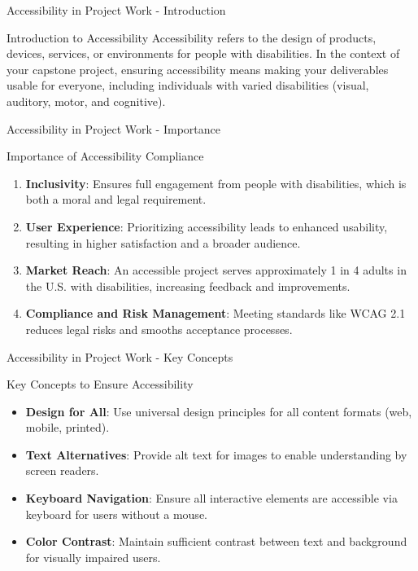 \documentclass[aspectratio=169]{beamer}
\begin{document}
\begin{frame}[fragile]{Accessibility in Project Work - Introduction}
    \begin{block}{Introduction to Accessibility}
        Accessibility refers to the design of products, devices, services, or environments for people with disabilities. In the context of your capstone project, ensuring accessibility means making your deliverables usable for everyone, including individuals with varied disabilities (visual, auditory, motor, and cognitive).
    \end{block}
\end{frame}

\begin{frame}[fragile]{Accessibility in Project Work - Importance}
    \begin{block}{Importance of Accessibility Compliance}
        \begin{enumerate}
            \item \textbf{Inclusivity}: Ensures full engagement from people with disabilities, which is both a moral and legal requirement.
            \item \textbf{User Experience}: Prioritizing accessibility leads to enhanced usability, resulting in higher satisfaction and a broader audience.
            \item \textbf{Market Reach}: An accessible project serves approximately 1 in 4 adults in the U.S. with disabilities, increasing feedback and improvements.
            \item \textbf{Compliance and Risk Management}: Meeting standards like WCAG 2.1 reduces legal risks and smooths acceptance processes.
        \end{enumerate}
    \end{block}
\end{frame}

\begin{frame}[fragile]{Accessibility in Project Work - Key Concepts}
    \begin{block}{Key Concepts to Ensure Accessibility}
        \begin{itemize}
            \item \textbf{Design for All}: Use universal design principles for all content formats (web, mobile, printed).
            \item \textbf{Text Alternatives}: Provide alt text for images to enable understanding by screen readers.
            \item \textbf{Keyboard Navigation}: Ensure all interactive elements are accessible via keyboard for users without a mouse.
            \item \textbf{Color Contrast}: Maintain sufficient contrast between text and background for visually impaired users.
        \end{itemize}
    \end{block}
\end{frame}
\end{document}
